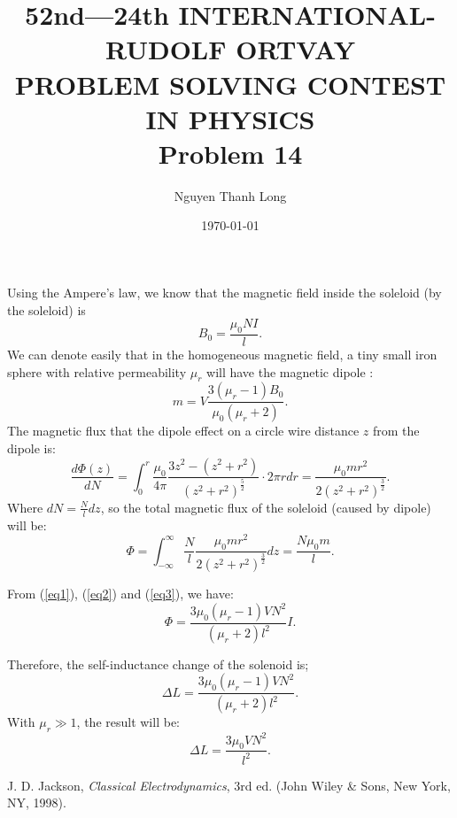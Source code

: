 \documentclass[12pt]{article}
\title{52nd—24th INTERNATIONAL-RUDOLF ORTVAY \\ PROBLEM SOLVING CONTEST IN PHYSICS \\ Problem 14}
\author{Nguyen Thanh Long}
\date{\today}
\begin{document}
	
\maketitle
	
\noindent Using the Ampere's law, we know that the magnetic field inside the soleloid (by the soleloid) is 
\begin{equation} \label{eq1}
	B_0 = \frac{\mu_0 N I}{l} .
\end{equation}	
\noindent We can denote easily that in the homogeneous magnetic field, a tiny small iron sphere with relative permeability $\mu_r$ will have the magnetic dipole \cite{1} :
\begin{equation} \label{eq2}
	m = V \frac{3 \left( \mu_r - 1 \right) B_0 }{\mu_0 \left( \mu_r + 2 \right) } .
\end{equation}	
\noindent The magnetic flux that the dipole effect on a circle wire distance $z$ from the dipole is:
$$ \frac{ d \Phi (z) }{d N} = \int_0^r \frac{\mu_0}{4 \pi}  \frac{ 3 z^2 - \left( z^2 + r^2 \right) }{ \left( z^2 + r^2 \right)^{\frac{5}{2}} } \cdot 2 \pi r dr = \frac{ \mu_0 m r^2 }{2 \left( z^2 + r^2 \right)^{\frac{3}{2}} } .$$
\noindent Where $dN = \frac{N}{l} dz$, so the total magnetic flux of the soleloid (caused by dipole) will be:
\begin{equation} \label{eq3}
	\Phi = \int_{-\infty}^{\infty} \frac{N}{l} \frac{ \mu_0 m r^2 }{2 \left( z^2 + r^2 \right)^{\frac{3}{2}} } dz = \frac{ N \mu_0 m}{l} .
\end{equation}	

\noindent From (\ref{eq1}), (\ref{eq2}) and (\ref{eq3}), we have:
$$ \Phi = \frac{ 3 \mu_0 \left( \mu_r -1 \right) V N^2}{\left( \mu_r + 2 \right) l^2 } I .$$

\noindent Therefore, the self-inductance change of the solenoid is;
$$ \Delta L = \frac{ 3 \mu_0 \left( \mu_r -1 \right) V N^2}{\left( \mu_r + 2 \right) l^2 } .$$
\noindent With $\mu_r \gg 1$, the result will be: 
$$ \Delta L = \frac{ 3 \mu_0 V N^2}{l^2} .$$


\begin{thebibliography}{1}
	 J. D. Jackson, \textit{Classical Electrodynamics}, 3rd ed. (John Wiley \& Sons, New York, NY, 1998).
\end{thebibliography}	
	
\end{document}
